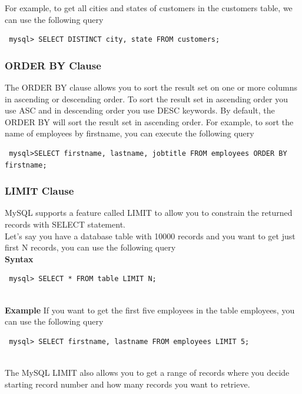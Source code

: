 \documentclass[11pt,a4paper]{article}
\begin{document}
For example, to get all cities and states of customers in the customers table, we can use the following query

\begin{verbatim} mysql> SELECT DISTINCT city, state FROM customers; \end{verbatim}

\subsubsection*{ORDER BY Clause}
The ORDER BY clause allows you to sort the result set on one or more columns in ascending or descending order. To sort the result set in ascending order you use ASC
and in descending order you use DESC keywords. By default, the ORDER BY will sort the result set in ascending order.
For example, to sort the name of employees by firstname, you can execute the following query\\
\begin{verbatim} mysql>SELECT firstname, lastname, jobtitle FROM employees ORDER BY firstname; \end{verbatim}
\subsubsection*{LIMIT Clause}
MySQL supports a feature called LIMIT to allow you to constrain the returned records with SELECT statement.\\

Let's say you have a database table with 10000 records and you want to get just first N records, you can use the following query\\

\textbf{Syntax}\\
\begin{verbatim} mysql> SELECT * FROM table LIMIT N; \end{verbatim}\\

\textbf{Example}
If you want to get the first five employees in the table employees, you can use the following query\\

\begin{verbatim} mysql> SELECT firstname, lastname FROM employees LIMIT 5; \end{verbatim}\\

The MySQL LIMIT also allows you to get a range of records where you decide starting record number and how many records you want to retrieve. \\
\end{document}
